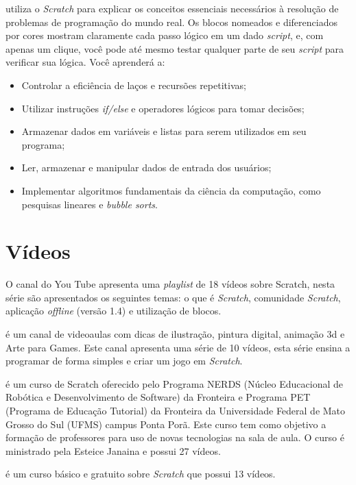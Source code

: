 \documentclass[12pt,fleqn]{book} %
\begin{document}
\textcite{marji2014aprenda} utiliza o \textit{Scratch} para explicar os conceitos essenciais necessários à resolução de problemas de programação do mundo real. Os blocos nomeados e diferenciados por cores mostram claramente cada passo lógico em um dado \textit{script}, e, com apenas um clique, você pode até mesmo testar qualquer parte de seu \textit{script} para verificar sua lógica. Você aprenderá a:

\begin{itemize}
	\item Controlar a eficiência de laços e recursões repetitivas;
	\item Utilizar instruções \textit{if/else} e operadores lógicos para tomar decisões;
	\item Armazenar dados em variáveis e listas para serem utilizados em seu programa;
	
	\item Ler, armazenar e manipular dados de entrada dos usuários;
	\item Implementar algoritmos fundamentais da ciência da computação, como pesquisas lineares e \textit{bubble sorts}.
\end{itemize}

\section{Vídeos}

O canal do You Tube \textcite{apensarem2018} apresenta uma \textit{playlist} de 18 vídeos sobre Scratch, nesta série são apresentados os seguintes temas: o que é \textit{Scratch}, comunidade \textit{Scratch}, aplicação \textit{offline} (versão 1.4) e utilização de blocos.
	
\textcite{ilustradicas2018} é um canal de videoaulas com dicas de ilustração, pintura digital, animação 3d e Arte para Games. Este canal apresenta uma série de 10 vídeos, esta série ensina a programar de forma simples e criar um jogo em \textit{Scratch}. 
	
\textcite{cursocompleto2018} é um curso de Scratch oferecido pelo Programa NERDS (Núcleo Educacional de Robótica e Desenvolvimento de Software) da Fronteira e Programa PET (Programa de Educação Tutorial) da Fronteira da Universidade Federal de Mato Grosso do Sul (UFMS) campus Ponta Porã. Este curso tem como objetivo a formação de professores para uso de novas tecnologias na sala de aula. O curso é ministrado pela Esteice Janaina e possui 27 vídeos.
	
\textcite{cursoexcel2018} é um curso básico e gratuito sobre \textit{Scratch} que possui 13 vídeos. 
	
\end{document}
